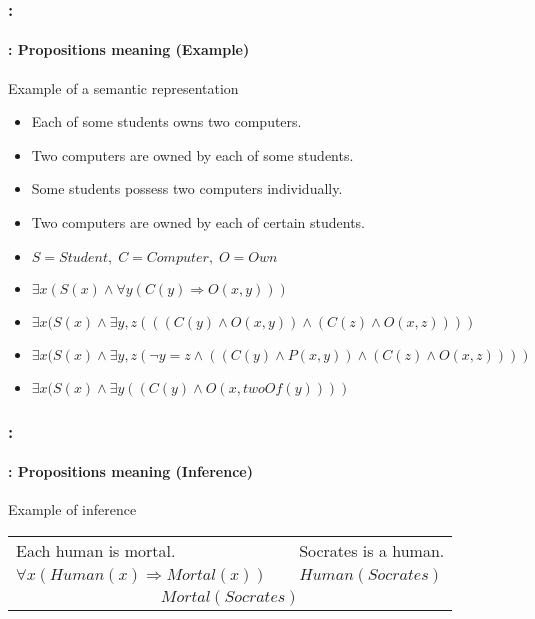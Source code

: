 \documentclass[xcolor=table]{beamer}
\begin{document}
\begin{frame}
	\frametitle{\insertshortsubtitle: \insertsection}
	\framesubtitle{\insertsubsection: Propositions meaning (Example)}

	\begin{exampleblock}{Example of a semantic representation}
		\begin{itemize}
			\item Each of some students owns two computers.
			\item Two computers are owned by each of some students.
			\item Some students possess two computers individually.
			\item Two computers are owned by each of certain students.
			\item $S = Student, \; C = Computer, \; O = Own$
			\item $\exists x (S(x) \wedge \forall y ( C(y) \Rightarrow O(x, y)) )$ \textcolor{red}{\XBox}
			\item $\exists x (S(x) \wedge \exists y, z (( (C(y) \wedge O(x, y) ) \wedge (C(z) \wedge O(x, z) ) ))$ \textcolor{red}{\XBox}
			\item $\exists x (S(x) \wedge \exists y, z (\neg y = z \wedge ( (C(y) \wedge P(x, y) ) \wedge (C(z) \wedge O(x, z) ) ))$ \textcolor{green}{\CheckedBox}
			\item $\exists x (S(x) \wedge \exists y ((C(y) \wedge O(x, twoOf(y)) ))$ \textcolor{green}{\CheckedBox}
		\end{itemize}
	\end{exampleblock}

\end{frame}

\begin{frame}
	\frametitle{\insertshortsubtitle: \insertsection}
	\framesubtitle{\insertsubsection: Propositions meaning (Inference)}

	\begin{exampleblock}{Example of inference}
		\centering
		\begin{tabular}{lll}
			Each human is mortal.  & & Socrates is a human. \\
			$\forall x (Human(x) \Rightarrow Mortal(x))$ && $Human(Socrates)$ \\
			\hline
			\multicolumn{3}{c}{$Mortal(Socrates)$}\\
		\end{tabular}
		
	\end{exampleblock}

\end{frame}
\end{document}
